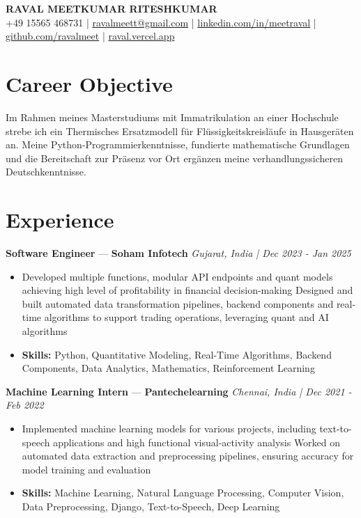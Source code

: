 \documentclass[a4paper,10pt]{article}
\begin{document}
\begin{center}
  {\Large\bfseries RAVAL MEETKUMAR RITESHKUMAR}\\[2pt]
  {\small +49 15565 468731 \;|\; \href{mailto:ravalmeett@gmail.com}{ravalmeett@gmail.com} \;|\; \href{https://www.linkedin.com/in/meetraval/}{linkedin.com/in/meetraval} \;|\; \href{https://github.com/ravalmeet}{github.com/ravalmeet} \;|\; \href{https://raval.vercel.app/}{raval.vercel.app}}
\end{center}
\vspace{-3pt}

\section*{Career Objective}
Im Rahmen meines Masterstudiums mit Immatrikulation an einer Hochschule strebe ich ein Thermisches Ersatzmodell für Flüssigkeitskreisläufe in Hausgeräten an. Meine Python-Programmierkenntnisse, fundierte mathematische Grundlagen und die Bereitschaft zur Präsenz vor Ort ergänzen meine verhandlungssicheren Deutschkenntnisse.\par

\section*{Experience}
\textbf{Software Engineer} — \textbf{Soham Infotech} \hfill \textit{Gujarat, India \;|\; Dec 2023 - Jan 2025}\par
\vspace{1pt}
\begin{itemize}
  \item Developed multiple functions, modular API endpoints and quant models achieving high level of profitability in financial decision-making Designed and built automated data transformation pipelines, backend components and real-time algorithms to support trading operations, leveraging quant and AI algorithms
  \item \textbf{Skills:} Python, Quantitative Modeling, Real-Time Algorithms, Backend Components, Data Analytics, Mathematics, Reinforcement Learning
\end{itemize}
\vspace{3pt}
\textbf{Machine Learning Intern} — \textbf{Pantechelearning} \hfill \textit{Chennai, India \;|\; Dec 2021 - Feb 2022}\par
\vspace{1pt}
\begin{itemize}
  \item Implemented machine learning models for various projects, including text-to-speech applications and high functional visual-activity analysis Worked on automated data extraction and preprocessing pipelines, ensuring accuracy for model training and evaluation
  \item \textbf{Skills:} Machine Learning, Natural Language Processing, Computer Vision, Data Preprocessing, Django, Text-to-Speech, Deep Learning
\end{itemize}
\end{document}
